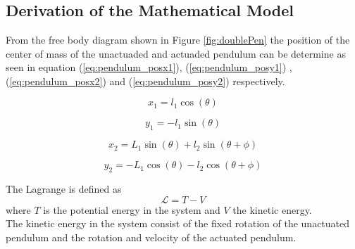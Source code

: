 \chapter{}

\section{Derivation of the Mathematical Model}
\label{sec:math_model}

From the free body diagram shown in Figure \ref{fig:doublePen} the position of the center of mass of the unactuaded and actuaded pendulum can be determine as seen in equation (\ref{eq:pendulum_posx1}), (\ref{eq:pendulum_posy1}) , (\ref{eq:pendulum_posx2}) and (\ref{eq:pendulum_posy2}) respectively.

\begin{equation}
\label{eq:pendulum_posx1}
x_{1}= l_{1}\cos(\theta)
\end{equation}

\begin{equation}
\label{eq:pendulum_posy1}
y_{1} = -l_{1}\sin(\theta)
\end{equation}

\begin{equation}
\label{eq:pendulum_posx2}
x_{2} = L_{1}\sin(\theta) + l_{2}\sin(\theta + \phi)
\end{equation}

\begin{equation}
\label{eq:pendulum_posy2}
y_{2} = -L_{1}\cos(\theta) - l_{2}\cos(\theta + \phi)
\end{equation}

The Lagrange is defined as 
$$\mathcal{L}=T-V$$
where $T$ is the potential energy in the system and $V$ the kinetic energy.\\

The kinetic energy in the system consist of the fixed rotation of the unactuated  pendulum and the rotation and velocity of the actuated pendulum.

